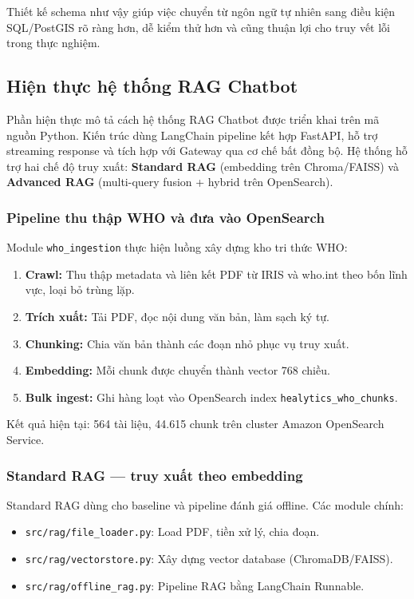 Thiết kế schema như vậy giúp việc chuyển từ ngôn ngữ tự nhiên sang điều kiện SQL/PostGIS rõ ràng hơn, dễ kiểm thử hơn và cũng thuận lợi cho truy vết lỗi trong thực nghiệm.


\subsection{Hiện thực hệ thống RAG Chatbot}

Phần hiện thực mô tả cách hệ thống RAG Chatbot được triển khai trên mã nguồn Python. Kiến trúc dùng LangChain pipeline kết hợp FastAPI, hỗ trợ streaming response và tích hợp với Gateway qua cơ chế bất đồng bộ. Hệ thống hỗ trợ hai chế độ truy xuất: \textbf{Standard RAG} (embedding trên Chroma/FAISS) và \textbf{Advanced RAG} (multi-query fusion + hybrid trên OpenSearch).

\subsubsection{Pipeline thu thập WHO và đưa vào OpenSearch}

Module \texttt{who\_ingestion} thực hiện luồng xây dựng kho tri thức WHO:

\begin{enumerate}
    \item \textbf{Crawl:} Thu thập metadata và liên kết PDF từ IRIS và who.int theo bốn lĩnh vực, loại bỏ trùng lặp.
    \item \textbf{Trích xuất:} Tải PDF, đọc nội dung văn bản, làm sạch ký tự.
    \item \textbf{Chunking:} Chia văn bản thành các đoạn nhỏ phục vụ truy xuất.
    \item \textbf{Embedding:} Mỗi chunk được chuyển thành vector 768 chiều.
    \item \textbf{Bulk ingest:} Ghi hàng loạt vào OpenSearch index \texttt{healytics\_who\_chunks}.
\end{enumerate}

Kết quả hiện tại: 564 tài liệu, 44.615 chunk trên cluster Amazon OpenSearch Service.

\subsubsection{Standard RAG --- truy xuất theo embedding}

Standard RAG dùng cho baseline và pipeline đánh giá offline. Các module chính:

\begin{itemize}
    \item \texttt{src/rag/file\_loader.py}: Load PDF, tiền xử lý, chia đoạn.
    \item \texttt{src/rag/vectorstore.py}: Xây dựng vector database (ChromaDB/FAISS).
    \item \texttt{src/rag/offline\_rag.py}: Pipeline RAG bằng LangChain Runnable.
\end{itemize}

